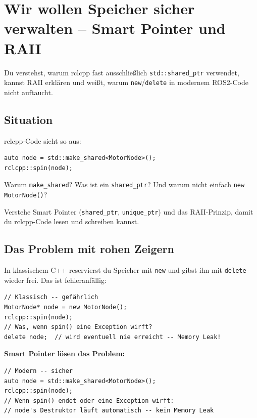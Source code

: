 \chapter{Wir wollen Speicher sicher verwalten –
  Smart Pointer und RAII}

\begin{lernziele}
Du verstehst, warum rclcpp fast ausschließlich
\texttt{std::shared\_ptr} verwendet,
kannst RAII erklären und weißt,
warum \texttt{new}/\texttt{delete} in modernem ROS2-Code nicht auftaucht.
\end{lernziele}

\section{Situation}

rclcpp-Code sieht so aus:

\begin{lstlisting}[style=cpp]
auto node = std::make_shared<MotorNode>();
rclcpp::spin(node);
\end{lstlisting}

Warum \texttt{make\_shared}? Was ist ein \texttt{shared\_ptr}?
Und warum nicht einfach \texttt{new MotorNode()}?

\begin{aufgabeBox}
Verstehe Smart Pointer (\texttt{shared\_ptr}, \texttt{unique\_ptr})
und das RAII-Prinzip, damit du rclcpp-Code lesen und schreiben kannst.
\end{aufgabeBox}

\section{Das Problem mit rohen Zeigern}

\begin{wissenBox}
In klassischem C++ reservierst du Speicher mit \texttt{new}
und gibst ihn mit \texttt{delete} wieder frei.
Das ist fehleranfällig:

\begin{lstlisting}[style=cpp]
// Klassisch -- gefährlich
MotorNode* node = new MotorNode();
rclcpp::spin(node);
// Was, wenn spin() eine Exception wirft?
delete node;  // wird eventuell nie erreicht -- Memory Leak!
\end{lstlisting}

\textbf{Smart Pointer lösen das Problem:}

\begin{lstlisting}[style=cpp]
// Modern -- sicher
auto node = std::make_shared<MotorNode>();
rclcpp::spin(node);
// Wenn spin() endet oder eine Exception wirft:
// node's Destruktor läuft automatisch -- kein Memory Leak
\end{lstlisting}
\end{wissenBox}

